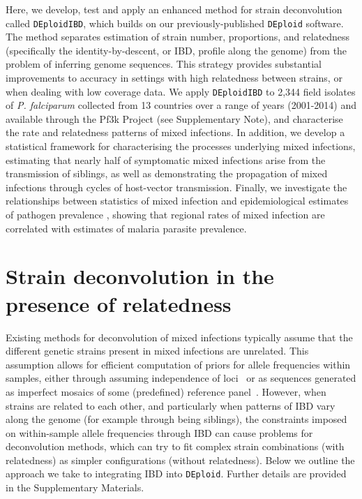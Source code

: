 \documentclass[9pt,lineno]{elife}
\begin{document}

Here, we develop, test and apply an enhanced method for strain deconvolution called \texttt{DEploidIBD}, which builds on our previously-published \texttt{DEploid} software.  The method separates estimation of strain number, proportions, and relatedness (specifically the identity-by-descent, or IBD, profile along the genome) from the problem of inferring genome sequences. This strategy provides substantial improvements to accuracy in settings with high relatedness between strains, or when dealing with low coverage data.  We apply \texttt{DEploidIBD} to 2,344 field isolates of {\it P. falciparum} collected from 13 countries over a range of years (2001-2014) and available through the Pf3k Project (see Supplementary Note), and characterise the rate and relatedness patterns of mixed infections.  In addition, we develop a statistical framework for characterising the processes underlying mixed infections, estimating that nearly half of symptomatic mixed infections arise from the transmission of siblings, as well as demonstrating the propagation of mixed infections through cycles of host-vector transmission.  Finally, we investigate the relationships between statistics of mixed infection and epidemiological estimates of pathogen prevalence \citep{MAP2017}, showing that regional rates of mixed infection are correlated with estimates of malaria parasite prevalence.

\section{Strain deconvolution in the presence of relatedness}

Existing methods for deconvolution of mixed infections typically assume that the different genetic strains present in mixed infections are unrelated.  This assumption allows for efficient computation of priors for allele frequencies within samples, either through assuming independence of loci~\citep{Jack2016} or as sequences generated as imperfect mosaics of some (predefined) reference panel~\citep{Zhu2017}.  However, when strains are related to each other, and particularly when patterns of IBD vary along the genome (for example through being siblings), the constraints imposed on within-sample allele frequencies through IBD can cause problems for deconvolution methods, which can try to fit complex strain combinations (with relatedness) as simpler configurations (without relatedness).  Below we outline the approach we take to integrating IBD into \texttt{DEploid}.  Further details are provided in the Supplementary Materials.
\end{document}
